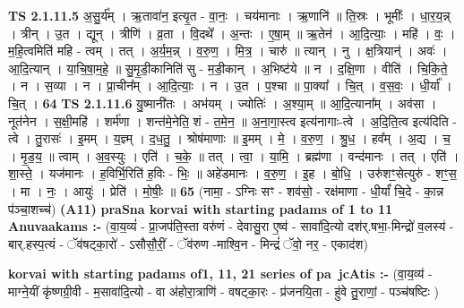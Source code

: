 \documentclass[17pt]{extarticle}
\begin{document}
                  \newline
                                \textbf{ TS 2.1.11.5} \newline
                  अ॒सु॒र्य᳚म् । ऋ॒तावा॑न॒ इत्यृ॒त - वा॒नः॒ । चय॑मानाः । ऋ॒णानि॑ ॥ ति॒स्रः । भूमीः᳚ । धा॒र॒य॒न्न् । त्रीन् । उ॒त । द्यून् । त्रीणि॑ । व्र॒ता । वि॒दथे᳚ । अ॒न्तः । ए॒षा॒म् ॥ ऋ॒तेन॑ । आ॒दि॒त्याः॒ । महि॑ । वः॒ । म॒हि॒त्वमिति॑ महि - त्वम् । तत् । अ॒र्य॒म॒न्न् । व॒रु॒ण॒ । मि॒त्र॒ । चारु॑ ॥ त्यान् । नु । क्ष॒त्रियान्॑ । अवः॑ । आ॒दि॒त्यान् । या॒चि॒षा॒म॒हे॒ ॥ सु॒मृ॒डी॒कानिति॑ सु - म॒डी॒कान् । अ॒भिष्ट॑ये ॥ न । द॒क्षि॒णा । वीति॑ । चि॒कि॒ते॒ । न । स॒व्या । न । प्रा॒चीन᳚म् । आ॒दि॒त्याः॒ । न । उ॒त । प॒श्चा ॥ पा॒क्या᳚ । चि॒त् । व॒स॒वः॒ । धी॒र्या᳚ । चि॒त् । \textbf{  64} \newline
                  \newline
                                \textbf{ TS 2.1.11.6} \newline
                  यु॒ष्मानी॑तः । अभ॑यम् । ज्योतिः॑ । अ॒श्या॒म् ॥ आ॒दि॒त्याना᳚म् । अव॑सा । नूत॑नेन । स॒क्षी॒महि॑ । शर्म॑णा । शन्त॑मे॒नेति॒ शं - त॒मे॒न॒ ॥ अ॒ना॒गा॒स्त्व इत्य॑नागाः-त्वे । अ॒दि॒ति॒त्व इत्य॑दिति - त्वे । तु॒रासः॑ । इ॒मम् । य॒ज्ञ्म् । द॒ध॒तु॒ । श्रोष॑माणाः ॥ इ॒मम् । मे॒ । व॒रु॒ण॒ । श्रु॒ध॒ । हव᳚म् । अ॒द्य । च॒ । मृ॒ड॒य॒ ॥ त्वाम् । अ॒व॒स्युः । एति॑ । च॒के॒ ॥ तत् । त्वा॒ । या॒मि॒ । ब्रह्म॑णा । वन्द॑मानः । तत् । एति॑ । शा॒स्ते॒ । यज॑मानः । ह॒विर्भि॒रिति॑ ह॒विः - भिः॒ ॥ अहे॑डमानः । व॒रु॒ण॒ । इ॒ह । बो॒धि॒ । उरु॑शꣳ॒॒सेत्युरु॑ - शꣳ॒॒स॒ । मा । नः॒ । आयुः॑ । प्रेति॑ । मो॒षीः॒ ॥ \textbf{  65 } \newline
                  \newline
                       (नामा॒ - ऽग्निः सꣳ - शव॑सो॒ - रक्ष॑माणा - धी॒र्यां॑ चि॒दे - का॒न्न प॑ञ्चा॒शच्च॑)  \textbf{(A11)} \newline \newline
\textbf{praSna korvai with starting padams of 1 to 11 Anuvaakams :-} \newline
(वा॒य॒व्यं॑ - प्रा॒जप॑ति॒स्ता वरु॑णं - देवासु॒रा ए॒ष्व॑ - सावा॑दि॒त्यो दश॑र्.षभा॒-मिन्द्रो॑ व॒लस्य॑ - बार्.हस्प॒त्यं - ॅव॑षट्का॒रो॑ - ऽसौसौ॒रीं॒ - ॅव॑रुण -माश्वि॒न - मिन्द्रं॑ ॅवो॒ नर॒ - एकाद॑श) \newline

\textbf{korvai with starting padams of1, 11, 21 series of pa~jcAtis :-} \newline
(वा॒य॒व्य॑ - माग्ने॒यीं कृ॑ष्णग्री॒वी - म॒सावा॑दि॒त्यो - वा अ॑होरा॒त्राणि॑ - वषट्का॒रः - प्र॑जनयि॒ता - हु॑वे तु॒राणां॒ - पञ्च॑षष्टिः ) \newline
\end{document}
